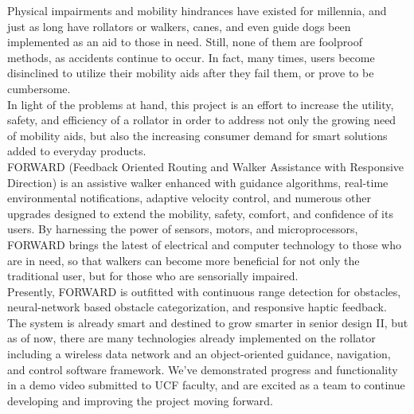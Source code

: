 \noindent Physical impairments and mobility hindrances have existed for millennia, and just as long have rollators or walkers, canes, and even guide dogs been implemented as an aid to those in need. Still, none of them are foolproof methods, as accidents continue to occur. In fact, many times, users become disinclined to utilize their mobility aids after they fail them, or prove to be cumbersome.\\

\noindent In light of the problems at hand, this project is an effort to increase the utility, safety, and efficiency of a rollator in order to address not only the growing need of mobility aids, but also the increasing consumer demand for smart solutions added to everyday products.\\

\noindent FORWARD (Feedback Oriented Routing and Walker Assistance with Responsive Direction) is an assistive walker enhanced with guidance algorithms, real-time environmental notifications, adaptive velocity control, and numerous other upgrades designed to extend the mobility, safety, comfort, and confidence of its users. By harnessing the power of sensors, motors, and microprocessors, FORWARD brings the latest of electrical and computer technology to those who are in need, so that walkers can become more beneficial for not only the traditional user, but for those who are sensorially impaired.\\

\noindent Presently, FORWARD is outfitted with continuous range detection for obstacles, neural-network based obstacle categorization, and responsive haptic feedback. The system is already smart and destined to grow smarter in senior design II, but as of now, there are many technologies already implemented on the rollator including a wireless data network and an object-oriented guidance, navigation, and control software framework. We've demonstrated progress and functionality in a demo video submitted to UCF faculty, and are excited as a team to continue developing and improving the project moving forward.\\


